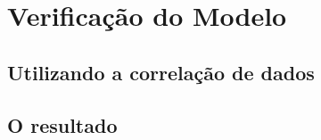 \chapter{Verificação do Modelo}
\label{chap:verificacao_do_modelo}


\section{Utilizando a correlação de dados}
\label{sec:verificacao_do_modelo_utilizando_a_correlacao_de_dados}


\section{O resultado}
\label{sec:verificacao_do_modelo_o_resultado}

